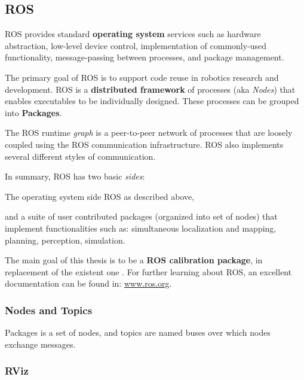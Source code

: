 \vspace*{-0.5ex}
\subsection{ROS}
\label{sec:ros}

ROS provides standard \textbf{operating system} services such as hardware abstraction, low-level device control, implementation of commonly-used functionality, message-passing between processes, and package management.

The primary goal of ROS is to support code reuse in robotics research and development. ROS is a \textbf{distributed framework} of processes (aka \textit{Nodes}) that enables executables to be individually designed. These processes can be grouped into \textbf{Packages}.

The ROS runtime \textit{graph} is a peer-to-peer network of processes that are loosely coupled using the ROS communication infrastructure. ROS also implements several different styles of communication.

In summary, ROS has two basic \textit{sides}:
\begin{itemize*}
 \item The operating system side ROS as described above,
 \item and a suite of user contributed packages (organized into set of nodes) that implement functionalities such as: simultaneous localization and mapping, planning, perception, simulation.
\end{itemize*}

The main goal of this thesis is to be a \textbf{ROS calibration package}, in replacement of the existent one \cite{pr2_calibration}. For further learning about ROS, an excellent documentation can be found in: \url{www.ros.org}.

\subsubsection{Nodes and Topics}
\label{sec:nodes}
Packages is a set of nodes, and topics are named buses over which nodes exchange messages.

\subsubsection{RViz}
\label{sec:rviz}

